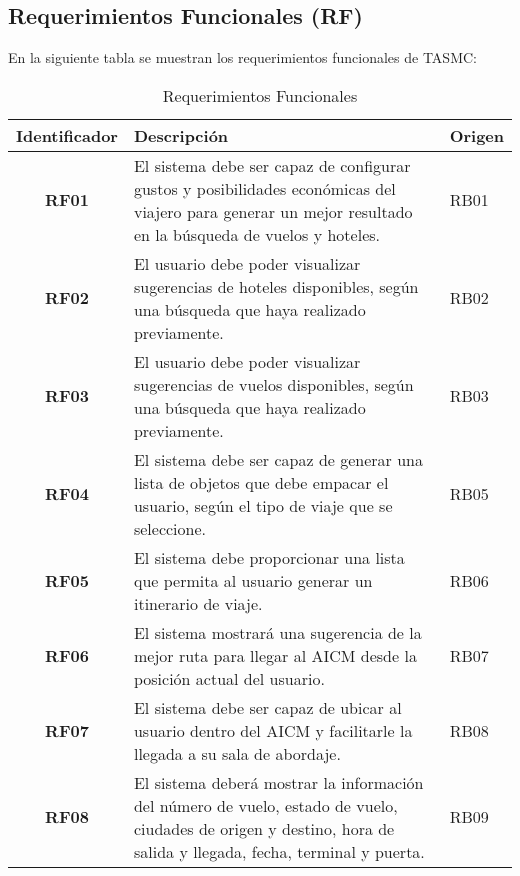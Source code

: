 \subsection{Requerimientos Funcionales (RF)}

En la siguiente tabla se muestran los requerimientos funcionales de TASMC:

\begin{table}
	\begin{center}
		\begin{tabular}{|c|p{9.4cm}|p{1.5cm}|}
			\hline \rowcolor[RGB]{0,102,204} 
				\textcolor{blanco}{\bf Identificador} &
				\textcolor{blanco}{\bf Descripción} &
				\textcolor{blanco}{\bf Origen} \\
			\hline \rowcolor[RGB]{224,224,224} 
				\textbf{RF01} &
				El sistema debe ser capaz de configurar gustos y posibilidades económicas del viajero para generar un mejor resultado en la búsqueda de vuelos y hoteles. &
				RB01 \\
      		\hline 
      			\textbf{RF02} &
				El usuario debe poder visualizar sugerencias de hoteles disponibles,  según una búsqueda que haya realizado previamente. &
				RB02 \\
			\hline \rowcolor[RGB]{224,224,224} 
				\textbf{RF03} &
				El usuario debe poder visualizar sugerencias de vuelos disponibles, según una búsqueda que haya realizado previamente. &
				RB03 \\ 
			\hline
				\textbf{RF04} &
				El sistema debe ser capaz de generar una lista de objetos que debe empacar el usuario, según el tipo de viaje que se seleccione. &
				RB05 \\ 
			\hline \rowcolor[RGB]{224,224,224} 
				\textbf{RF05} &
				El sistema debe proporcionar una lista que permita al usuario generar un itinerario de viaje. &
				RB06 \\ 
			\hline
				\textbf{RF06} &
				El sistema mostrará una sugerencia de la mejor ruta para llegar al AICM desde la posición actual del usuario. &
				RB07 \\ 
			\hline \rowcolor[RGB]{224,224,224} 
				\textbf{RF07} &
				El sistema debe ser capaz de ubicar al usuario dentro del AICM y facilitarle la llegada a su sala de abordaje. &
				RB08 \\ 
			\hline
				\textbf{RF08} &
				El sistema deberá mostrar la información del número de vuelo, estado de vuelo, ciudades de origen y destino, 					hora de salida y llegada, fecha, terminal y puerta. &
				RB09 \\ 
			\hline
		\end{tabular}
	\end{center}
	\caption[Requerimientos Funcionales]{Requerimientos Funcionales} 
	\label{tab:reqFuncionales}
\end{table}

